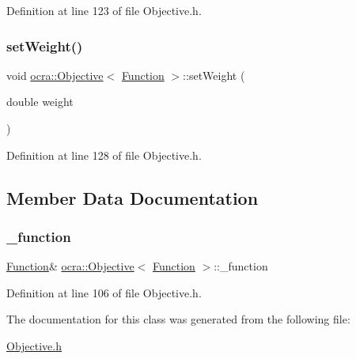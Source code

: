 Definition at line 123 of file Objective.\+h.

\hypertarget{classocra_1_1Objective_3_01Function_01_4_a41fa85e1e535bb935f20312e7b398a26}{}\label{classocra_1_1Objective_3_01Function_01_4_a41fa85e1e535bb935f20312e7b398a26} 
\subsubsection{\texorpdfstring{set\+Weight()}{setWeight()}}
{\footnotesize\ttfamily void \hyperlink{classocra_1_1Objective}{ocra\+::\+Objective}$<$ \hyperlink{classocra_1_1Function}{Function} $>$\+::set\+Weight (\begin{DoxyParamCaption}\item[{double}]{weight }\end{DoxyParamCaption})\hspace{0.3cm}{\ttfamily [inline]}}



Definition at line 128 of file Objective.\+h.



\subsection{Member Data Documentation}
\hypertarget{classocra_1_1Objective_3_01Function_01_4_a68d84f4b46839664695f62c12ed8092d}{}\label{classocra_1_1Objective_3_01Function_01_4_a68d84f4b46839664695f62c12ed8092d} 
\subsubsection{\texorpdfstring{\+\_\+function}{\_function}}
{\footnotesize\ttfamily \hyperlink{classocra_1_1Function}{Function}\& \hyperlink{classocra_1_1Objective}{ocra\+::\+Objective}$<$ \hyperlink{classocra_1_1Function}{Function} $>$\+::\+\_\+function\hspace{0.3cm}{\ttfamily [protected]}}



Definition at line 106 of file Objective.\+h.



The documentation for this class was generated from the following file\+:\begin{DoxyCompactItemize}
\item 
\hyperlink{Objective_8h}{Objective.\+h}\end{DoxyCompactItemize}
